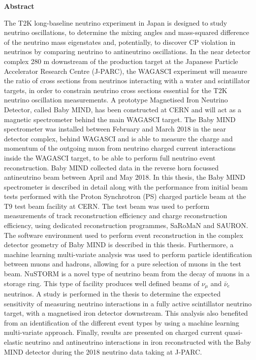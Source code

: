 \vspace*{0.75in}
\begin{center} {\bf Abstract}\end{center}

The T2K long-baseline neutrino experiment in Japan is designed to study neutrino oscillations, to determine the mixing angles and mass-squared difference of the neutrino mass eigenstates and, potentially, to discover CP violation in neutrinos by comparing neutrino to antineutrino oscillations. In the near detector complex 280 m downstream of the production target at the Japanese Particle Accelerator Research Centre (J-PARC), the WAGASCI experiment will measure the ratio of cross sections from neutrinos interacting with a water and scintillator targets, in order to constrain neutrino cross sections essential for the T2K neutrino oscillation measurements. A prototype Magnetised Iron Neutrino Detector, called Baby MIND, has been constructed at CERN and will act as a magnetic spectrometer behind the main WAGASCI target. The Baby MIND spectrometer was installed between February and March 2018 in the near detector complex, behind WAGASCI and is able to measure the charge and momentum of the outgoing muon from neutrino charged current interactions inside the WAGASCI target, to be able to perform full neutrino event reconstruction. Baby MIND collected data in the reverse horn focussed antineutrino beam between April and May 2018. In this thesis, the Baby MIND spectrometer is described in detail along with the performance from initial beam tests performed with the Proton Synchrotron (PS) charged particle beam at the T9 test beam facility at CERN. The test beam was used to perform measurements of track reconstruction efficiency and charge reconstruction efficiency, using dedicated reconstruction programmes, SaRoMaN and SAURON. The software environment used to perform event reconstruction in the complex detector geometry of Baby MIND is described in this thesis. Furthermore, a machine learning multi-variate analysis was used to perform particle identification between muons and hadrons, allowing for a pure selection of muons in the test beam. NuSTORM is a novel type of neutrino beam from the decay of muons in a storage ring. This type of facility produces well defined beams of $\nu_\mu$ and $\bar{\nu}_e$ neutrinos. A study is performed in the thesis to determine the expected sensitivity of measuring neutrino interactions in a fully active scintillator neutrino target, with a magnetised iron detector downstream. This analysis also benefited from an identification of the different event types by using a machine learning multi-variate approach. Finally, results are presented on charged current quasi-elastic neutrino and antineutrino interactions in iron reconstructed with the Baby MIND detector during the 2018 neutrino data taking at J-PARC.

